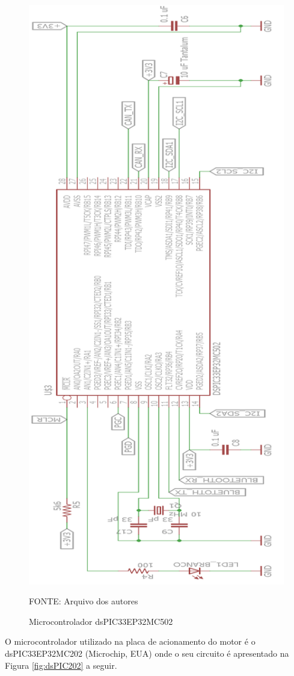 \documentclass[
	12pt,				%
	openany,			%
	twoside,			%
	a4paper,			%
	english,			%
	french,				%
	spanish,			%
	brazil,				%
	oldfontcommands
	]{abntex2}
\begin{document}
\begin{figure}[th]
	\caption{Microcontrolador dsPIC33EP32MC502}
	\centering
	\includegraphics[height=1.2\linewidth]{./figs/dsPIC_master}
	
	\begin{small}
		FONTE: Arquivo dos autores
	\end{small}
	\label{fig:dsPIC502}
\end{figure} 

\newpage

O microcontrolador utilizado na placa de acionamento do motor é o dsPIC33EP32MC202 (Microchip, EUA) onde o seu circuito é apresentado na Figura \ref{fig:dsPIC202} a seguir.
\end{document}
